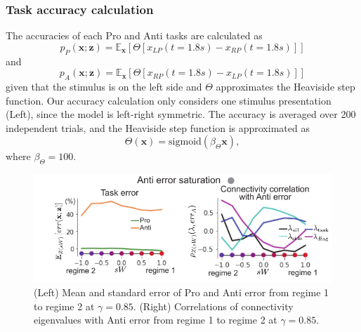 \documentclass[11pt]{article}
\begin{document}
\subsubsection{Task accuracy calculation} \label{methods_sc_acc}
The accuracies of each Pro and Anti tasks are calculated as
\begin{equation}
p_P(\mathbf{x}; \mathbf{z}) = \mathbb{E}_{\mathbf{x}}\left[\Theta[x_{LP}(t=1.8s) - x_{RP}(t=1.8s)]\right]
\end{equation}
and 
\begin{equation}
p_A(\mathbf{x}; \mathbf{z}) = \mathbb{E}_{\mathbf{x}}\left[\Theta[x_{RP}(t=1.8s) - x_{LP}(t=1.8s)]\right]
\end{equation}
given that the stimulus is on the left side and $\Theta$ approximates the Heaviside step function.
Our accuracy calculation only considers one stimulus presentation (Left), since the model is left-right symmetric.
The accuracy is averaged over 200 independent trials, and the Heaviside step function is approximated as
\begin{equation}
\Theta(\mathbf{x}) = \text{sigmoid}(\beta_{\Theta} \mathbf{x}),
\end{equation}
where $\beta_{\Theta} = 100$.


\begin{figure}
\begin{center}
\includegraphics[scale=1.2]{figures/figSC5/figSC5.pdf}
\end{center}
\caption{
(Left) Mean and standard error of Pro and Anti error from regime 1 to regime 2 at $\gamma = 0.85$.
(Right) Correlations of connectivity eigenvalues with Anti error from regime 1 to regime 2 at $\gamma = 0.85$.
}
\label{fig:SC5}
\end{figure}
\end{document}
